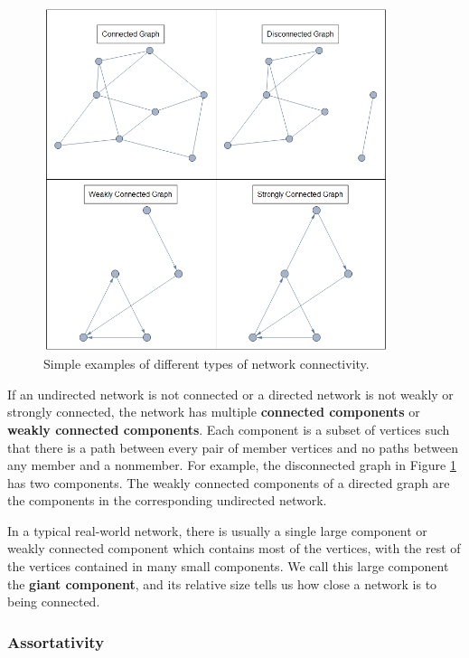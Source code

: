 \documentclass[12pt]{thesis}
\theoremstyle{plain}
\theoremstyle{definition}
\theoremstyle{remark}
\begin{document}
\begin{figure}[t]
\centering
\includegraphics[width=0.9\textwidth]{connectivity_demo.png}
\caption{Simple examples of different types of network connectivity.}
\label{fig:connectivity_demo}
\end{figure}

If an undirected network is not connected or a directed network is not weakly or strongly connected, the network has multiple \textbf{connected components} or \textbf{weakly connected components}. Each component is a subset of vertices such that there is a path between every pair of member vertices and no paths between any member and a nonmember. For example, the disconnected graph in Figure \ref{fig:connectivity_demo} has two components. The weakly connected components of a directed graph are the components in the corresponding undirected network.

In a typical real-world network, there is usually a single large component or weakly connected component which contains most of the vertices, with the rest of the vertices contained in many small components. We call this large component the \textbf{giant component}, and its relative size tells us how close a network is to being connected.

\subsubsection{Assortativity}
\end{document}
